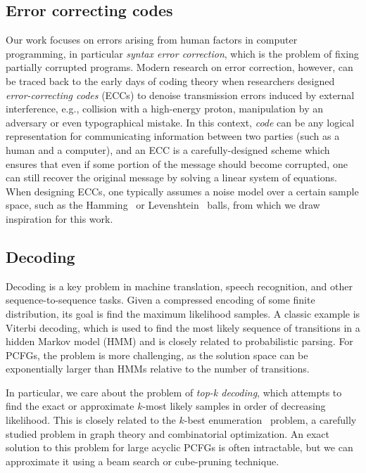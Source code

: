 \documentclass[sigplan,acmsmall,nonacm,screen]{acmart}\settopmatter{printfolios=false,printccs=false,printacmref=false}
\begin{document}
  \subsection{Error correcting codes}

  Our work focuses on errors arising from human factors in computer programming, in particular \textit{syntax error correction}, which is the problem of fixing partially corrupted programs. Modern research on error correction, however, can be traced back to the early days of coding theory when researchers designed \textit{error-correcting codes} (ECCs) to denoise transmission errors induced by external interference, e.g., collision with a high-energy proton, manipulation by an adversary or even typographical mistake. In this context, \textit{code} can be any logical representation for communicating information between two parties (such as a human and a computer), and an ECC is a carefully-designed scheme which ensures that even if some portion of the message should become corrupted, one can still recover the original message by solving a linear system of equations. When designing ECCs, one typically assumes a noise model over a certain sample space, such as the Hamming~\cite{titsias2017hamming, dong2023number} or Levenshtein~\cite{levenshtein1966binary, becerra2008learning, barlev2021levenshtein} balls, from which we draw inspiration for this work.

  \subsection{Decoding}

Decoding is a key problem in machine translation, speech recognition, and other sequence-to-sequence tasks. Given a compressed encoding of some finite distribution, its goal is find the maximum likelihood samples. A classic example is Viterbi decoding, which is used to find the most likely sequence of transitions in a hidden Markov model (HMM) and is closely related to probabilistic parsing. For PCFGs, the problem is more challenging, as the solution space can be exponentially larger than HMMs relative to the number of transitions.

In particular, we care about the problem of \textit{top-k decoding}, which attempts to find the exact or approximate $k$-most likely samples in order of decreasing likelihood. This is closely related to the $k$-best enumeration~\cite{eppstein2014k} problem, a carefully studied problem in graph theory and combinatorial optimization. An exact solution to this problem for large acyclic PCFGs is often intractable, but we can approximate it using a beam search or cube-pruning technique.
\end{document}
